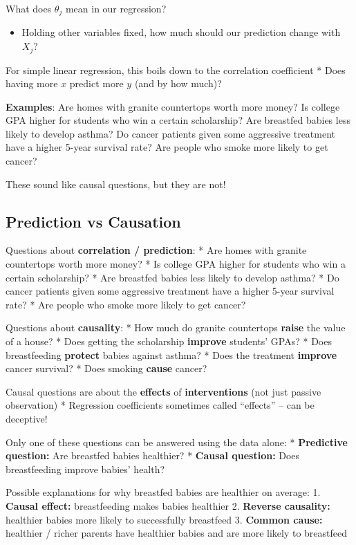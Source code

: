 \documentclass[
  letterpaper,
  DIV=11,
  numbers=noendperiod]{scrreprt}
\providecommand{\tightlist}{%
  \setlength{\itemsep}{0pt}\setlength{\parskip}{0pt}}\usepackage{longtable,booktabs,array}
\begin{document}
What does \(\theta_{j}\) mean in our regression?

\begin{itemize}
\tightlist
\item
  Holding other variables fixed, how much should our prediction change
  with \(X_{j}\)?
\end{itemize}

For simple linear regression, this boils down to the correlation
coefficient * Does having more \(x\) predict more \(y\) (and by how
much)?

\textbf{Examples}: Are homes with granite countertops worth more money?
Is college GPA higher for students who win a certain scholarship? Are
breastfed babies less likely to develop asthma? Do cancer patients given
some aggressive treatment have a higher 5-year survival rate? Are people
who smoke more likely to get cancer?

These sound like causal questions, but they are not!

\hypertarget{prediction-vs-causation}{%
\subsection{Prediction vs Causation}\label{prediction-vs-causation}}

Questions about \textbf{correlation / prediction}: * Are homes with
granite countertops worth more money? * Is college GPA higher for
students who win a certain scholarship? * Are breastfed babies less
likely to develop asthma? * Do cancer patients given some aggressive
treatment have a higher 5-year survival rate? * Are people who smoke
more likely to get cancer?

Questions about \textbf{causality}: * How much do granite countertops
\textbf{raise} the value of a house? * Does getting the scholarship
\textbf{improve} students' GPAs? * Does breastfeeding \textbf{protect}
babies against asthma? * Does the treatment \textbf{improve} cancer
survival? * Does smoking \textbf{cause} cancer?

Causal questions are about the \textbf{effects} of
\textbf{interventions} (not just passive observation) * Regression
coefficients sometimes called ``effects'' -- can be deceptive!

Only one of these questions can be answered using the data alone: *
\textbf{Predictive question:} Are breastfed babies healthier? *
\textbf{Causal question:} Does breastfeeding improve babies' health?

Possible explanations for why breastfed babies are healthier on average:
1. \textbf{Causal effect:} breastfeeding makes babies healthier 2.
\textbf{Reverse causality:} healthier babies more likely to successfully
breastfeed 3. \textbf{Common cause:} healthier / richer parents have
healthier babies and are more likely to breastfeed
\end{document}
